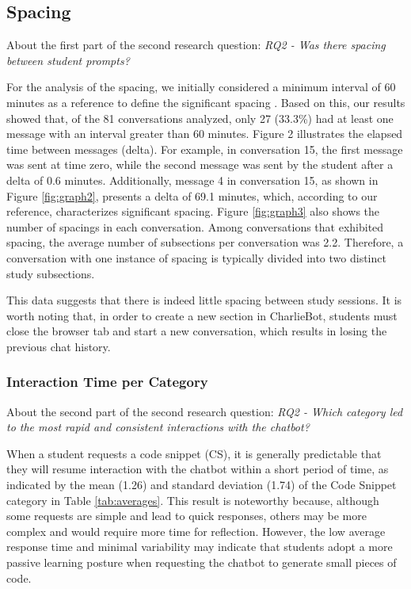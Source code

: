 \documentclass[a4paper,twoside]{article}
\begin{document}
\subsection{Spacing}

About the first part of the second research question: \textit{RQ2 - Was there
spacing between student prompts?}

For the analysis of the spacing, we initially considered a minimum interval of
60 minutes as a reference to define the significant spacing \citep{Gadella24}.
Based on this, our results showed that, of the 81 conversations analyzed, only
27 (33.3\%) had at least one message with an interval greater than 60 minutes.
Figure 2 illustrates the elapsed time between messages (delta). For example,
in conversation 15, the first message was sent at time zero, while the second
message was sent by the student after a delta of 0.6 minutes. Additionally,
message 4 in conversation 15, as shown in Figure \ref{fig:graph2}, presents a
delta of 69.1 minutes, which, according to our reference, characterizes
significant spacing. Figure \ref{fig:graph3} also shows the number of spacings
in each conversation. Among conversations that exhibited spacing, the
average number of subsections per conversation was 2.2. Therefore, a
conversation with one instance of spacing is typically divided into two distinct
study subsections.

This data suggests that there is indeed little spacing between study sessions.
It is worth noting that, in order to create a new section in CharlieBot,
students must close the browser tab and start a new conversation, which results
in losing the previous chat history.

\subsubsection{Interaction Time per Category}

About the second part of the second research question: \textit{RQ2 - Which
category led to the most rapid and consistent interactions with the chatbot?}

When a student requests a code snippet (CS), it is generally predictable that
they will resume interaction with the chatbot within a short period of time, as
indicated by the mean (1.26) and standard deviation (1.74) of the Code Snippet
category in Table \ref{tab:averages}. This result is noteworthy because,
although some requests are simple and lead to quick responses, others may be
more complex and would require more time for reflection. However, the low
average response time and minimal variability may indicate that students adopt a
more passive learning posture when requesting the chatbot to generate small pieces
of code.
\end{document}
